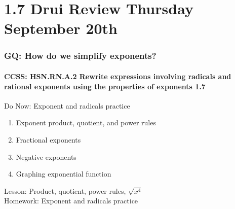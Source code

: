\documentclass{beamer}
\begin{document}
\section{1.7 Drui Review Thursday September 20th}
  \frame
  {
    \frametitle{GQ: How do we simplify exponents?}
    \framesubtitle{CCSS: HSN.RN.A.2 Rewrite expressions involving radicals and rational exponents using the properties of exponents  \alert{1.7}}

    \begin{block}{Do Now: Exponent and radicals practice}
      \begin{enumerate}
      \item Exponent product, quotient, and power rules
      \item Fractional exponents
      \item Negative exponents
      \item Graphing exponential function
      \end{enumerate}
   \end{block}
    Lesson: Product, quotient, power rules, $\sqrt{x^4}$ \\ \bigskip
    Homework: Exponent and radicals practice
  }
\end{document}
